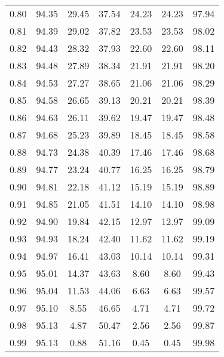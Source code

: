 \begin{tabular}{|c|c|c|c|c|c|c|}
      0.80 &     94.35 &     29.45 &      37.54 &   24.23 &      24.23 &         97.94 \\
      0.81 &     94.39 &     29.02 &      37.82 &   23.53 &      23.53 &         98.02 \\
      0.82 &     94.43 &     28.32 &      37.93 &   22.60 &      22.60 &         98.11 \\
      0.83 &     94.48 &     27.89 &      38.34 &   21.91 &      21.91 &         98.20 \\
      0.84 &     94.53 &     27.27 &      38.65 &   21.06 &      21.06 &         98.29 \\
      0.85 &     94.58 &     26.65 &      39.13 &   20.21 &      20.21 &         98.39 \\
      0.86 &     94.63 &     26.11 &      39.62 &   19.47 &      19.47 &         98.48 \\
      0.87 &     94.68 &     25.23 &      39.89 &   18.45 &      18.45 &         98.58 \\
      0.88 &     94.73 &     24.38 &      40.39 &   17.46 &      17.46 &         98.68 \\
      0.89 &     94.77 &     23.24 &      40.77 &   16.25 &      16.25 &         98.79 \\
      0.90 &     94.81 &     22.18 &      41.12 &   15.19 &      15.19 &         98.89 \\
      0.91 &     94.85 &     21.05 &      41.51 &   14.10 &      14.10 &         98.98 \\
      0.92 &     94.90 &     19.84 &      42.15 &   12.97 &      12.97 &         99.09 \\
      0.93 &     94.93 &     18.24 &      42.40 &   11.62 &      11.62 &         99.19 \\
      0.94 &     94.97 &     16.41 &      43.03 &   10.14 &      10.14 &         99.31 \\
      0.95 &     95.01 &     14.37 &      43.63 &    8.60 &       8.60 &         99.43 \\
      0.96 &     95.04 &     11.53 &      44.06 &    6.63 &       6.63 &         99.57 \\
      0.97 &     95.10 &      8.55 &      46.65 &    4.71 &       4.71 &         99.72 \\
      0.98 &     95.13 &      4.87 &      50.47 &    2.56 &       2.56 &         99.87 \\
      0.99 &     95.13 &      0.88 &      51.16 &    0.45 &       0.45 &         99.98 \\
\bottomrule
\end{tabular}
